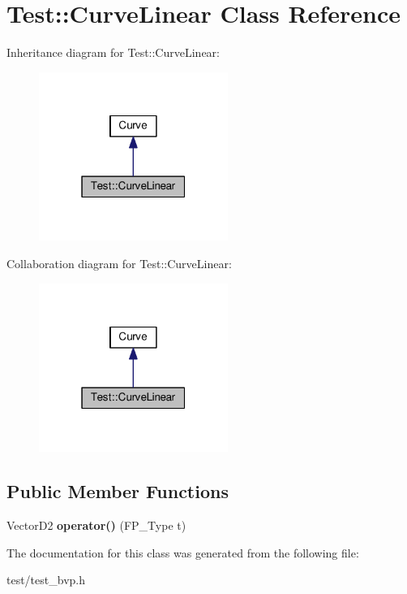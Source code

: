 \hypertarget{classTest_1_1CurveLinear}{}\section{Test\+:\+:Curve\+Linear Class Reference}
\label{classTest_1_1CurveLinear}


Inheritance diagram for Test\+:\+:Curve\+Linear\+:
\nopagebreak
\begin{figure}[H]
\begin{center}
\leavevmode
\includegraphics[width=175pt]{classTest_1_1CurveLinear__inherit__graph}
\end{center}
\end{figure}


Collaboration diagram for Test\+:\+:Curve\+Linear\+:
\nopagebreak
\begin{figure}[H]
\begin{center}
\leavevmode
\includegraphics[width=175pt]{classTest_1_1CurveLinear__coll__graph}
\end{center}
\end{figure}
\subsection*{Public Member Functions}
\begin{DoxyCompactItemize}
\item 
\mbox{\label{classTest_1_1CurveLinear_aa260424d3fa52ecacb9ef438c9c2b8e8}} 
Vector\+D2 {\bfseries operator()} (F\+P\+\_\+\+Type t)
\end{DoxyCompactItemize}


The documentation for this class was generated from the following file\+:\begin{DoxyCompactItemize}
\item 
test/test\+\_\+bvp.\+h\end{DoxyCompactItemize}

